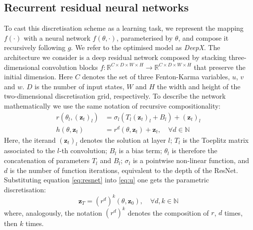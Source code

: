 \documentclass[utf8]{frontiersSCNS} %
\begin{document}
\subsection{Recurrent residual neural networks}
\label{sec:methods:rnn}
To cast this discretisation scheme as a learning task, we represent the mapping $f(\cdot)$ with a neural network $f(\theta, \cdot)$, parameterised by $\theta$, and compose it recursively following $g$. We refer to the optimised model as \textit{DeepX}.
The architecture we consider is a deep residual network \cite[]{He2016DeepRecognition} composed by stacking three-dimensional convolution blocks $f: \mathbb{R}^{C \times D \times W \times H} \rightarrow \mathbb{R}^{C \times D \times W \times H}$ that preserve the initial dimension. Here $C$ denotes the set of three Fenton-Karma variables, $u$, $v$ and $w$. $D$ is the number of input states, $W$ and $H$ the width and height of the two-dimensional discretisation grid, respectively.
To describe the network mathematically we use the same notation of recursive compositionality:
\begin{align}
    r(\theta_l, (\mathbf{z}_{t})_l) &= \sigma_l(T_l (\mathbf{z}_{t})_l + B_l) + (\mathbf{z}_{t})_l \\
    h(\theta, \mathbf{z}_t) &= r^d(\theta, \mathbf{z}_t) + \mathbf{z}_t,  \quad \forall d \in \mathbb{N} \label{eq:resnet}
\end{align}
Here, the iterand $(\mathbf{z}_t)_l$ denotes the solution at layer $l$; $T_l$ is the Toeplitz matrix associated to the $l$-th convolution; $B_l$ is a bias term; $\theta_l$ is therefore the concatenation of parameters $T_l$ and $B_l$; $\sigma_l$ is a pointwise non-linear function, and $d$ is the number of function iterations, equivalent to the depth of the ResNet.
Substituting equation \eqref{eq:resnet} into \eqref{eq:u} one gets the parametric discretisation:
\begin{equation}
    \mathbf{z}_{T} = (r^d)^k(\theta, \mathbf{z}_0),  \quad \forall d,k \in \mathbb{N}
    \label{eq:odeint}
\end{equation}
where, analogously, the notation $(r^d)^k$ denotes the composition of $r$, $d$ times, then $k$ times.
\end{document}
